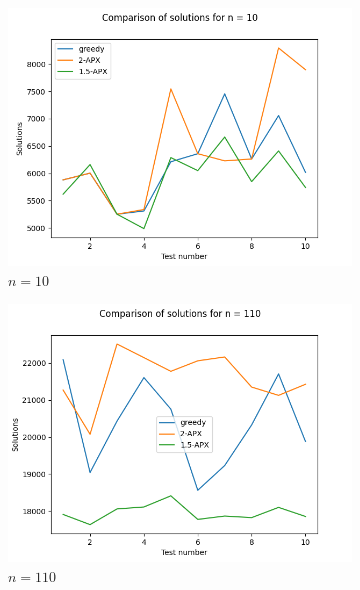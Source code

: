 \documentclass{article}
\begin{document}
\begin{figure}
	\begin{subfigure}{0.5\textwidth}
		\includegraphics[width=\textwidth]{figs/results1000-1.png}
		\caption{$n = 10$}
		\label{fig:rezultat1000-1}
	\end{subfigure}
	\begin{subfigure}{0.5\textwidth}
		\centering
		\includegraphics[width=\textwidth]{figs/results1000-2.png}
		\caption{$n = 110$}
		\label{fig:rezultat1000-2}
	\end{subfigure}
	\newline
	\begin{subfigure}{0.5\textwidth}
		\centering

\end{subfigure}
\end{figure}
\end{document}
